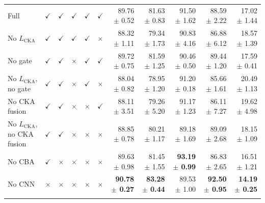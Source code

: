 \documentclass[10pt]{article}
\begin{document}
{\begin{longtable}{lccccc rrrrr}
\addlinespace[4pt]
\multicolumn{11}{l}{\textit{Source: USOVA $\rightarrow$ Target: OVATUS}} \\
\midrule
Full & $\checkmark$ & $\checkmark$ & $\checkmark$ & $\checkmark$ & $\checkmark$ & 89.76 $\pm$ 0.52 & 81.63 $\pm$ 0.83 & 91.50 $\pm$ 1.62 & 88.59 $\pm$ 2.22 & 17.02 $\pm$ 1.44 \\
No $L_{\mathrm{CKA}}$ & $\checkmark$ & $\checkmark$ & $\checkmark$ & $\checkmark$ & $\times$ & 88.32 $\pm$ 1.11 & 79.34 $\pm$ 1.73 & 90.83 $\pm$ 4.16 & 86.88 $\pm$ 6.12 & 18.57 $\pm$ 1.39 \\
No gate & $\checkmark$ & $\checkmark$ & $\times$ & $\checkmark$ & $\checkmark$ & 89.72 $\pm$ 0.75 & 81.59 $\pm$ 1.25 & 90.46 $\pm$ 0.50 & 89.44 $\pm$ 1.20 & 17.59 $\pm$ 0.41 \\
No $L_{\mathrm{CKA}}$, no gate & $\checkmark$ & $\checkmark$ & $\times$ & $\checkmark$ & $\times$ & 88.04 $\pm$ 0.82 & 78.95 $\pm$ 1.20 & 91.20 $\pm$ 0.18 & 85.66 $\pm$ 1.61 & 20.49 $\pm$ 1.13 \\
No CKA fusion & $\checkmark$ & $\checkmark$ & $\times$ & $\times$ & $\checkmark$ & 88.11 $\pm$ 3.51 & 79.26 $\pm$ 5.20 & 91.17 $\pm$ 1.23 & 86.11 $\pm$ 7.27 & 19.62 $\pm$ 4.98 \\
No $L_{\mathrm{CKA}}$, no CKA fusion & $\checkmark$ & $\checkmark$ & $\times$ & $\times$ & $\times$ & 88.85 $\pm$ 0.78 & 80.21 $\pm$ 1.17 & 89.18 $\pm$ 1.69 & 89.09 $\pm$ 2.68 & 18.15 $\pm$ 1.09 \\
No CBA & $\checkmark$ & $\times$ & $\times$ & $\times$ & $\times$ & 89.63 $\pm$ 0.98 & 81.45 $\pm$ 1.55 & \textbf{93.19 $\pm$ 0.99} & 86.83 $\pm$ 2.65 & 16.51 $\pm$ 1.21 \\
No CNN & $\times$ & $\times$ & $\times$ & $\times$ & $\times$ & \textbf{90.78 $\pm$ 0.27} & \textbf{83.28 $\pm$ 0.44} & 89.53 $\pm$ 1.00 & \textbf{92.50 $\pm$ 0.95} & \textbf{14.19 $\pm$ 0.25} \\
\addlinespace[4pt]
\end{longtable}
}
\end{document}
